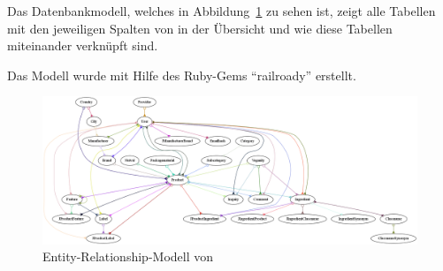 \label{appendix:db}

Das Datenbankmodell, welches in Abbildung~\ref{pdf:erd} zu sehen ist,
zeigt alle Tabellen mit den jeweiligen Spalten von \name in der
Übersicht und wie diese Tabellen miteinander verknüpft sind.

Das Modell wurde mit Hilfe des Ruby-Gems "`railroady"' erstellt.


\begin{figure}
  \centerline{\includegraphics[scale=0.4]{misc/important_models.png}}
  \caption{Entity-Relationship-Modell von \name}
  \label{pdf:erd}
\end{figure}